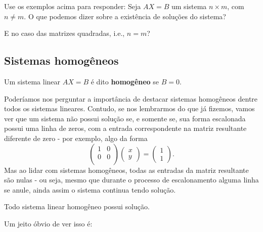 \begin{exerc}
	Use os exemplos acima para responder: Seja $AX=B$ um sistema $n\times m$, com $n\neq m$. O que podemos dizer sobre a existência de soluções do sistema?
	
	E no caso das matrizes quadradas, i.e., $n=m$?
\end{exerc}

\subsection{Sistemas homogêneos}

\begin{df}
	Um sistema linear $AX=B$ é dito \textbf{homogêneo} se $B=0$.
\end{df}

Poderíamos nos perguntar a importância de destacar sistemas homogêneos dentre todos os sistemas lineares. Contudo, se nos lembrarmos do que já fizemos, vamos ver que um sistema não possui solução se, e somente se, sua forma escalonada possui uma linha de zeros, com a entrada correspondente na matriz resultante diferente de zero - por exemplo, algo da forma
\[\begin{pmatrix}
1&0\\
0&0\\
\end{pmatrix}\begin{pmatrix}
x\\y
\end{pmatrix}=\begin{pmatrix}
1\\1
\end{pmatrix}.\] Mas ao lidar com sistemas homogêneos, todas as entradas da matriz resultante são nulas - ou seja, mesmo que durante o processo de escalonamento alguma linha se anule, ainda assim o sistema continua tendo solução.

\begin{prop}
	Todo sistema linear homogêneo possui solução.
\end{prop}

Um jeito óbvio de ver isso é:

